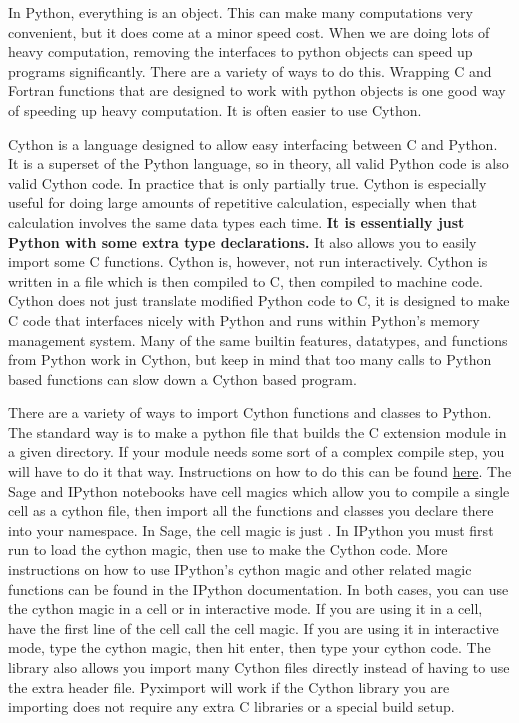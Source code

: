 

In Python, everything is an object.
This can make many computations very convenient, but it does come at a minor speed cost.
When we are doing lots of heavy computation, removing the interfaces to python objects can speed up programs significantly.
There are a variety of ways to do this.
Wrapping C and Fortran functions that are designed to work with python objects is one good way of speeding up heavy computation.
It is often easier to use Cython.

Cython is a language designed to allow easy interfacing between C and Python.
It is a superset of the Python language, so in theory, all valid Python code is also valid Cython code.
In practice that is only partially true.
Cython is especially useful for doing large amounts of repetitive calculation, especially when that calculation involves the same data types each time.
\textbf{It is essentially just Python with some extra type declarations.}
It also allows you to easily import some C functions.
Cython is, however, not run interactively.
Cython is written in a  file which is then compiled to C, then compiled to machine code.
Cython does not just translate modified Python code to C, it is designed to make C code that interfaces nicely with Python and runs within Python's memory management system.
Many of the same builtin features, datatypes, and functions from Python work in Cython, but keep in mind that too many calls to Python based functions can slow down a Cython based program.

There are a variety of ways to import Cython functions and classes to Python.
The standard way is to make a python file that builds the C extension module in a given directory.
If your module needs some sort of a complex compile step, you will have to do it that way.
Instructions on how to do this can be found \href{http://docs.cython.org/src/reference/compilation.html}{here}.
The Sage and IPython notebooks have cell magics which allow you to compile a single cell as a cython file, then import all the functions and classes you declare there into your namespace.
In Sage, the cell magic is just .
In IPython you must first run  to load the cython magic, then use  to make the Cython code.
More instructions on how to use IPython's cython magic and other related magic functions can be found in the IPython documentation.
In both cases, you can use the cython magic in a cell or in interactive mode.
If you are using it in a cell, have the first line of the cell call the cell magic.
If you are using it in interactive mode, type the cython magic, then hit enter, then type your cython code.
The library  also allows you import many Cython files directly instead of having to use the extra header file.
Pyximport will work if the Cython library you are importing does not require any extra C libraries or a special build setup.

